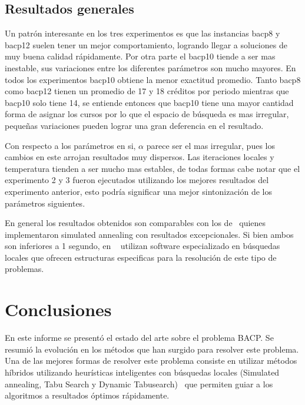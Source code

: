 \documentclass[letterpaper,10pt]{article}
\begin{document}
\subsection{Resultados generales}
Un patrón interesante en los tres experimentos es que las instancias bacp8 y bacp12 suelen tener un mejor comportamiento, logrando llegar a soluciones de muy buena calidad rápidamente. Por otra parte el bacp10 tiende a ser mas inestable, sus variaciones entre los diferentes parámetros son mucho mayores. En todos los experimentos bacp10 obtiene la menor exactitud promedio. Tanto bacp8 como bacp12 tienen un promedio de 17 y 18 créditos por periodo mientras que bacp10 solo tiene 14, se entiende entonces que bacp10 tiene una mayor cantidad forma de asignar los cursos por lo que el espacio de búsqueda es mas irregular, pequeñas variaciones pueden lograr una gran deferencia en el resultado.

Con respecto a los parámetros en si, $\alpha$ parece ser el mas irregular, pues los cambios en este arrojan resultados muy dispersos. Las iteraciones locales y temperatura tienden a ser mucho mas estables, de todas formas cabe notar que el experimento 2 y 3 fueron ejecutados utilizando los mejores resultados del experimento anterior, esto podría significar una mejor sintonización de los parámetros siguientes.

En general los resultados obtenidos son comparables con los de~\cite{GbacpGaspero} quienes implementaron simulated annealing con resultados excepcionales. Si bien ambos son inferiores a 1 segundo, en ~\cite{GbacpGaspero} utilizan software especializado en búsquedas locales que ofrecen estructuras especificas para la resolución de este tipo de problemas.

\section{Conclusiones}

En este informe se presentó el estado del arte sobre el problema BACP. Se resumió la evolución en los métodos que han surgido para resolver este problema. Una de las mejores formas de resolver este problema consiste en utilizar métodos híbridos utilizando heurísticas inteligentes con búsquedas locales (Simulated annealing, Tabu Search y Dynamic Tabusearch)~\cite{GbacpGaspero} que permiten guiar a los algoritmos a resultados óptimos rápidamente.
\end{document}
